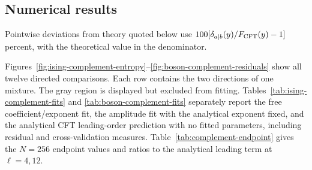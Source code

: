 \subsection{Numerical results}
\label{sec:complement-results}
Pointwise deviations from theory quoted below use
$100[\delta_{a\mid b}(y)/F_{\rm CFT}(y)-1]$ percent, with the
theoretical value in the denominator.

Figures~\ref{fig:ising-complement-entropy}--\ref{fig:boson-complement-residuals}
show all twelve directed comparisons. Each row contains the two
directions of one mixture. The gray region is displayed but excluded
from fitting. Tables~\ref{tab:ising-complement-fits} and
\ref{tab:boson-complement-fits} separately report the free
coefficient/exponent fit, the amplitude fit with the analytical exponent
fixed, and the analytical CFT leading-order prediction with no fitted
parameters, including residual and
cross-validation measures.
Table~\ref{tab:complement-endpoint} gives the $N=256$ endpoint values
and ratios to the analytical leading term at $\ell=4,12$.

